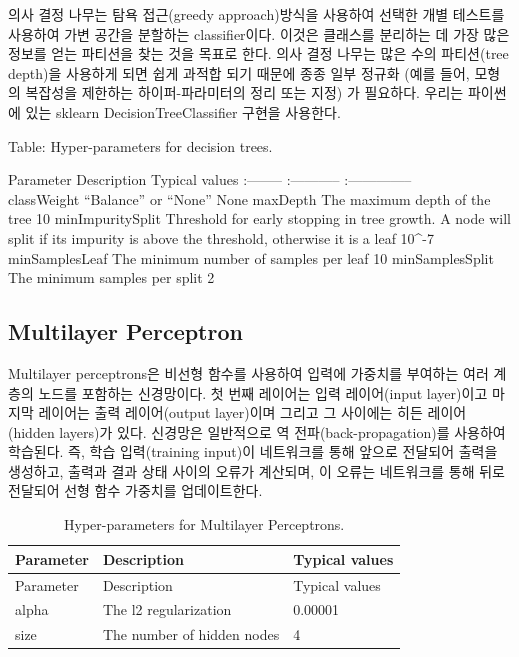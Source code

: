 \documentclass[11pt]{book}
\theoremstyle{definition}
\theoremstyle{definition}
\theoremstyle{definition}
\theoremstyle{remark}
\begin{document}
의사 결정 나무는 탐욕 접근(greedy approach)방식을 사용하여 선택한 개별
테스트를 사용하여 가변 공간을 분할하는 classifier이다. 이것은 클래스를
분리하는 데 가장 많은 정보를 얻는 파티션을 찾는 것을 목표로 한다. 의사
결정 나무는 많은 수의 파티션(tree depth)을 사용하게 되면 쉽게 과적합
되기 때문에 종종 일부 정규화 (예를 들어, 모형의 복잡성을 제한하는
하이퍼-파라미터의 정리 또는 지정) 가 필요하다. 우리는 파이썬에 있는
sklearn DecisionTreeClassifier 구현을 사용한다. 

Table: \label{tab:decisionTreeParameters} Hyper-parameters for decision
trees.

\textbar{} Parameter\textbar{} Description \textbar{} Typical values
\textbar{} \textbar{}:-------- \textbar{}:-----------
\textbar{}:-------------- \textbar{}\\
\textbar{} classWeight \textbar{} ``Balance'' or ``None'' \textbar{}
None \textbar{} \textbar{} maxDepth \textbar{} The maximum depth of the
tree \textbar{} 10 \textbar{} \textbar{} minImpuritySplit \textbar{}
Threshold for early stopping in tree growth. A node will split if its
impurity is above the threshold, otherwise it is a leaf \textbar{}
10\^{}-7\textbar{} \textbar{} minSamplesLeaf \textbar{} The minimum
number of samples per leaf \textbar{} 10 \textbar{} \textbar{}
minSamplesSplit \textbar{} The minimum samples per split \textbar{} 2
\textbar{}

\subsection{Multilayer Perceptron}\label{multilayer-perceptron}

Multilayer perceptrons은 비선형 함수를 사용하여 입력에 가중치를 부여하는
여러 계층의 노드를 포함하는 신경망이다. 첫 번째 레이어는 입력
레이어(input layer)이고 마지막 레이어는 출력 레이어(output layer)이며
그리고 그 사이에는 히든 레이어(hidden layers)가 있다. 신경망은
일반적으로 역 전파(back-propagation)를 사용하여 학습된다. 즉, 학습
입력(training input)이 네트워크를 통해 앞으로 전달되어 출력을 생성하고,
출력과 결과 상태 사이의 오류가 계산되며, 이 오류는 네트워크를 통해 뒤로
전달되어 선형 함수 가중치를 업데이트한다. 
 

\begin{longtable}[]{@{}lll@{}}
\caption{\label{tab:mpParameters} Hyper-parameters for Multilayer
Perceptrons.}\tabularnewline
\toprule
Parameter & Description & Typical values\tabularnewline
\midrule
\endfirsthead
\toprule
Parameter & Description & Typical values\tabularnewline
\midrule
\endhead
alpha & The l2 regularization & 0.00001\tabularnewline
size & The number of hidden nodes & 4\tabularnewline
\bottomrule
\end{longtable}
\end{document}
